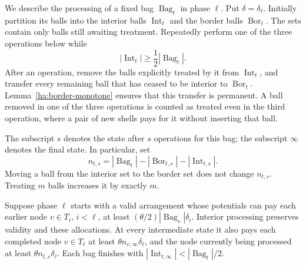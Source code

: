We describe the processing of a fixed bag $\operatorname{Bag}_t$ in
phase $\ell$.  Put $\delta=\delta_\ell$.  Initially partition its balls
into the interior balls $\operatorname{Int}_t$ and the border balls
$\operatorname{Bor}_t$.  The sets contain only balls still awaiting
treatment.  Repeatedly perform one of the three operations below while
\begin{equation}
 |\operatorname{Int}_t|\geq\frac12|\operatorname{Bag}_t|.
 \label{ha:interior-loop}
\end{equation}
After an operation, remove the balls explicitly treated by it from
$\operatorname{Int}_t$, and transfer every remaining ball that has
ceased to be interior to $\operatorname{Bor}_t$.  Lemma~\ref{ha:border-monotone}
ensures that this transfer is permanent.  A ball removed in one of the
three operations is counted as treated even in the third operation,
where a pair of new shells pays for it without inserting that ball.

The subscript $s$ denotes the state after $s$ operations for this bag;
the subscript $\infty$ denotes the final state.  In particular, set
\[
 n_{t,s}=|\operatorname{Bag}_t|
          -|\operatorname{Bor}_{t,s}|-|\operatorname{Int}_{t,s}|.
\]
Moving a ball from the interior set to the border set does not change
$n_{t,s}$.  Treating $m$ balls increases it by exactly $m$.

\begin{lemma}
\label{ha:construction}
Suppose phase $\ell$ starts with a valid arrangement whose potentials
can pay each earlier node $v\in T_i$, $i<\ell$, at least
$(\theta/2)|\operatorname{Bag}_v|\delta_i$.  Interior processing preserves
validity and these allocations.  At every intermediate state it also
pays each completed node $v\in T_\ell$ at least
$\theta n_{v,\infty}\delta_\ell$, and the node currently being processed
at least $\theta n_{t,s}\delta_\ell$.
Each bag finishes with
$|\operatorname{Int}_{t,\infty}|<|\operatorname{Bag}_t|/2$.
\end{lemma}

